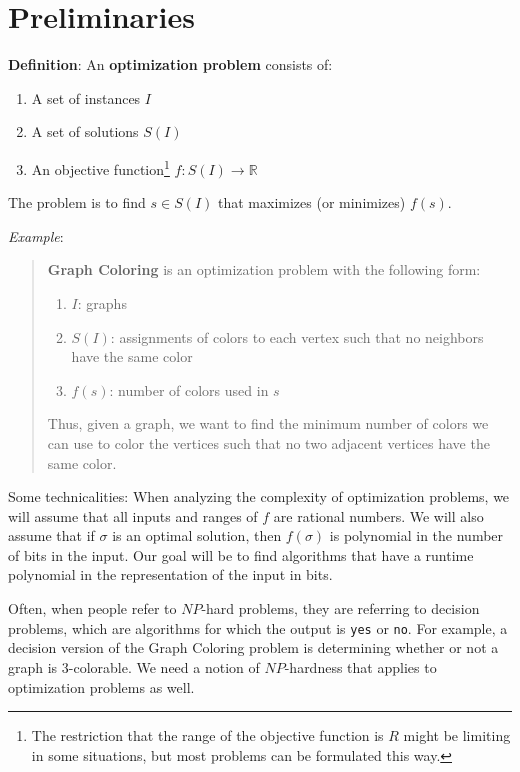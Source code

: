 \documentclass{article}
\begin{document}
\section{Preliminaries}

\textbf{Definition}:
  An \textbf{optimization
  problem} consists of:
  \begin{enumerate}
    \item A set of instances $I$
    \item A set of solutions $S(I)$
    \item An objective function\footnote{The
  restriction that the range of the objective function is
  {\boldmath$R$} might be limiting in some situations, but most problems
  can be formulated this way.}
    $f: S(I)\to \mathbb{R}$
  \end{enumerate}
  The problem is to find $s\in S(I)$ that maximizes (or minimizes)
  $f(s)$.

  \emph{Example}:
  \begin{quote}
  \textbf{Graph Coloring} is an optimization problem
  with the following form:
  \begin{enumerate}
    \item $I$: graphs
    \item $S(I)$: assignments of colors to each vertex such that
                  no neighbors have the same color
    \item $f(s)$: number of colors used in $s$
  \end{enumerate}
  Thus, given a graph, we want to find the minimum number of colors we can use to color the vertices such that no two adjacent vertices have the same color.
  \end{quote}

Some technicalities: When analyzing the complexity of optimization problems, we will assume that all inputs and ranges of $f$ are rational numbers. We will also assume that if $\sigma$ is an optimal solution, then $f(\sigma)$ is polynomial in the number of bits in the input. Our goal will be to find algorithms that have a runtime polynomial in the representation of the input in bits.

Often, when people refer to $NP$-hard problems, they are referring to
decision problems, which are algorithms for which the output is
\texttt{yes} or \texttt{no}.  For example, a decision version of
the Graph Coloring problem is determining whether or not a graph is
3-colorable.  We need a notion of $NP$-hardness that applies to
optimization problems as well.
\end{document}
